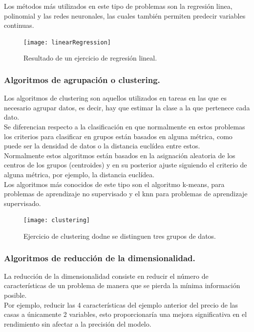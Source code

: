 \documentclass[a4paper,11pt]{article}
\begin{document}
\noindent
Los métodos más utilizados en este tipo de problemas son la regresión linea, polinomial y las redes neuronales, las cuales también permiten predecir variables continuas.\\

\begin{figure}[H]
\centering
\texttt{[image: linearRegression]}
\caption{Resultado de un ejercicio de regresión lineal.}
\end{figure}

\subsubsection{Algoritmos de agrupación o clustering.}
Los algoritmos de clustering son aquellos utilizados en tareas en las que es necesario agrupar datos, es decir, hay que estimar la clase a la que pertenece cada dato. \\

\noindent
Se diferencian respecto a la clasificación en que normalmente en estos problemas los criterios para clasificar en grupos están basados en alguna métrica, como puede ser la densidad de datos o la distancia euclídea entre estos.\\

\noindent
Normalmente estos algoritmos están basados en la asignación aleatoria de los centros de los grupos (centroides) y en su posterior ajuste siguiendo el criterio de alguna métrica, por ejemplo, la distancia euclídea. \\

\noindent
Los algoritmos más conocidos de este tipo son el algoritmo k-means, para problemas de aprendizaje no supervisado y el knn para problemas de aprendizaje supervisado.
\begin{figure}[H]
\centering
\texttt{[image: clustering]}
\caption{Ejercicio de clustering dodne se distinguen tres grupos de datos.}
\end{figure}


\subsubsection{Algoritmos de reducción de la dimensionalidad.}
La reducción de la dimensionalidad consiste en reducir el número de características de un problema de manera que se pierda la mínima información posible.\\
Por ejemplo, reducir las 4 características del ejemplo anterior del precio de las casas a únicamente 2 variables, esto proporcionaría una mejora significativa en el rendimiento sin afectar a la precisión del modelo.\\
\end{document}
